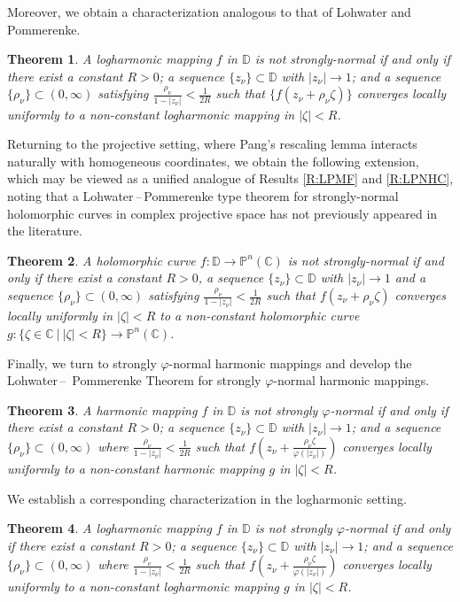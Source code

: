 \documentclass[10pt,a4paper]{amsart}
\newtheorem{theorem}{Theorem}[section]
\numberwithin{equation}{section}
\begin{document}
Moreover, we obtain a characterization analogous to that of Lohwater and Pommerenke.
\begin{theorem} \label{T:LPSNLHM}
A logharmonic mapping $f$ in $\mathbb{D}$ is not strongly-normal
if and only if there exist a constant $R>0$; a sequence $\{z_{\nu}\}\subset \mathbb{D}$ with 
$|z_{\nu}|\to1$; and a sequence $\{\rho_{\nu} \}\subset(0,\infty)$ satisfying 
$\displaystyle\frac{\rho_{\nu} }{1-|z_{\nu}|}<\frac{1}{2R}$ such that $\{f(z_{\nu}+\rho_{\nu} \zeta)\}$ 
converges locally uniformly to a non-constant logharmonic mapping in $|\zeta|<R$.
\end{theorem}
Returning to the projective setting, where Pang’s 
rescaling lemma interacts naturally with homogeneous coordinates, we obtain the following extension, which may be viewed as a unified analogue of Results 
\ref{R:LPMF} and \ref{R:LPNHC}, noting that a Lohwater\,–\,Pommerenke type theorem for strongly-normal holomorphic curves in complex projective space 
has not previously appeared in the literature.
\begin{theorem} \label{T:LPSNHCPNC}
A holomorphic curve $f:\mathbb{D}\to \mathbb P^n(\mathbb C)$ is not strongly-normal if and only if
there exist a constant $R>0$, a sequence $\{z_{\nu}\}\subset \mathbb{D}$ with $|z_{\nu}|\to1$
and a sequence $\{\rho_{\nu} \}\subset (0,\infty)$ satisfying $\displaystyle\frac{\rho_{\nu} }{1-|z_{\nu}|}<\frac{1}{2R}$ such that 
${f(z_{\nu}+\rho_{\nu} \zeta)}$ converges locally uniformly in $|\zeta|<R$ to a non-constant holomorphic curve $g:\{\zeta\in\mathbb C\ |\ |\zeta|<R\}\to\mathbb P^n(\mathbb C)$.
\end{theorem}
Finally, we turn to strongly $\varphi$-normal harmonic mappings and develop the Lohwater\,--
\,Pommerenke Theorem for strongly $\varphi$-normal harmonic mappings.
\begin{theorem} \label{T:LPSPNHM}
A harmonic mapping $f$ in $\mathbb D$ is not strongly $\varphi$-normal if and only if there exist a 
constant $R>0$; a sequence $\{z_{\nu}\}\subset\mathbb D$ with $|z_{\nu}|\to1$; and a sequence $\{\rho_{\nu} \}\subset(0,\infty)$ where 
$\displaystyle\frac{\rho_{\nu} }{1-|z_{\nu}|}<\frac{1}{2R}$ such that $f\left(z_{\nu}+\frac{\rho_{\nu} \zeta}{\varphi(|z_{\nu}|)}\right)$ converges locally 
uniformly to a non-constant harmonic mapping $g$ in $|\zeta|<R$.
\end{theorem}
We establish a corresponding characterization in the logharmonic setting.
\begin{theorem} \label{T:LPSPNLHM}
A logharmonic mapping $f$ in $\mathbb D$ is not strongly $\varphi$-normal if and only if there exist 
a constant $R>0$; a sequence $\{z_{\nu}\}\subset\mathbb D$ with $|z_{\nu}|\to1$; and 
a sequence $\{\rho_{\nu} \}\subset(0,\infty)$ where $\displaystyle\frac{\rho_{\nu} }{1-|z_{\nu}|}<\frac{1}{2R}$ such that $f\left(z_{\nu}+\frac{\rho_{\nu} \zeta}{\varphi(|z_{\nu}|)}\right)$ converges locally 
uniformly 
to a non-constant logharmonic mapping $g$ in $|\zeta|<R$.
\end{theorem}
\end{document}
